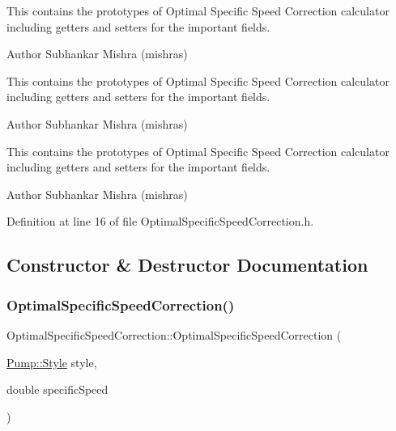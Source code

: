 This contains the prototypes of Optimal Specific Speed Correction calculator including getters and setters for the important fields.

\begin{DoxyAuthor}{Author}
Subhankar Mishra (mishras) 
\end{DoxyAuthor}


This contains the prototypes of Optimal Specific Speed Correction calculator including getters and setters for the important fields.

\begin{DoxyAuthor}{Author}
Subhankar Mishra (mishras) 
\end{DoxyAuthor}


This contains the prototypes of Optimal Specific Speed Correction calculator including getters and setters for the important fields.

\begin{DoxyAuthor}{Author}
Subhankar Mishra (mishras) 
\end{DoxyAuthor}


Definition at line 16 of file Optimal\+Specific\+Speed\+Correction.\+h.



\subsection{Constructor \& Destructor Documentation}
\mbox{\label{class_optimal_specific_speed_correction_a59cfd32e730fabce525602cbe0b646c4}} 
\subsubsection{\texorpdfstring{Optimal\+Specific\+Speed\+Correction()}{OptimalSpecificSpeedCorrection()}\hspace{0.1cm}{\footnotesize\ttfamily [1/3]}}
{\footnotesize\ttfamily Optimal\+Specific\+Speed\+Correction\+::\+Optimal\+Specific\+Speed\+Correction (\begin{DoxyParamCaption}\item[{\hyperlink{class_pump_aef354601ce4218258cc898b35a1e90ff}{Pump\+::\+Style}}]{style,  }\item[{double}]{specific\+Speed }\end{DoxyParamCaption})\hspace{0.3cm}{\ttfamily [inline]}}

